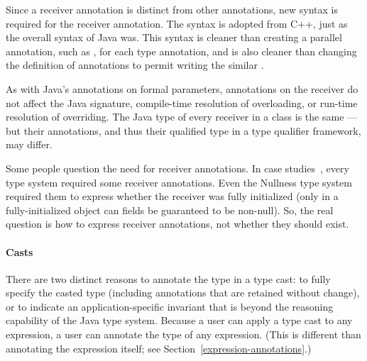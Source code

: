 \documentclass[10pt]{article}
\begin{document}
\noindent
Since a receiver annotation is distinct from other
annotations, new syntax is required for the receiver annotation.  The syntax
is adopted from C++, just as the overall syntax of Java was.
This syntax is cleaner than creating a parallel annotation, such as
, for each type annotation, and is also cleaner
than changing the definition of annotations to permit writing the similar
.


As with Java's annotations on formal parameters, annotations on the
receiver do not affect the Java signature,
compile-time resolution of overloading, or run-time resolution of
overriding.  The Java type of every receiver in a class is the same --- but
their annotations, and thus their qualified type in a type qualifier
framework, may differ.

Some people question the need for receiver annotations.  In
case studies~\cite{PapiACPE2008}, every type system required some
receiver annotations.  Even the Nullness type system required them to
express whether the receiver was fully initialized (only in a
fully-initialized object can fields be guaranteed to be non-null).
So, the real question is how to express receiver annotations, not
whether they should exist.


\paragraph{Casts}
There are two distinct reasons to annotate the type in a type cast:  to
fully specify the casted type (including annotations that are retained
without change), or to indicate
an application-specific invariant that is beyond the reasoning capability
of the Java type system.
Because a user can apply a type cast to any expression, a user can
annotate the type of any expression.  (This is different than annotating
the expression itself; see Section~\ref{expression-annotations}.)
\end{document}
